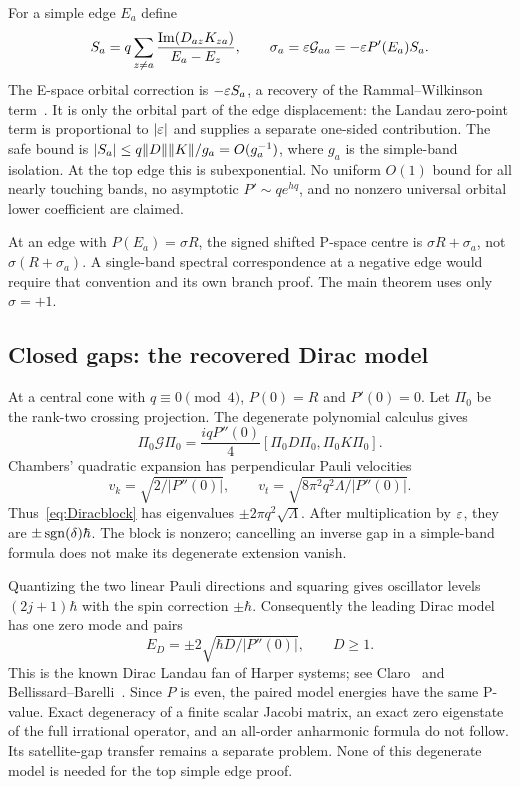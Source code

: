For a simple edge $E_a$ define
\[
 S_a=q\sum_{z\ne a}\frac{\operatorname{Im}(D_{az}K_{za})}{E_a-E_z},
 \qquad \sigma_a=\varepsilon\mathcal G_{aa}=-\varepsilon P'(E_a)S_a.
\]
The E-space orbital correction is $-\varepsilon S_a$, a recovery of the Rammal--Wilkinson term~\cite{RammalBellissard,Wilkinson1987,PST}. It is only the orbital part of the edge displacement: the Landau zero-point term is proportional to $|\varepsilon|$ and supplies a separate one-sided contribution. The safe bound is $|S_a|\le q\lVert D\rVert\lVert K\rVert/g_a=O(g_a^{-1})$, where $g_a$ is the simple-band isolation. At the top edge this is subexponential. No uniform $O(1)$ bound for all nearly touching bands, no asymptotic $P'\sim qe^{hq}$, and no nonzero universal orbital lower coefficient are claimed.

At an edge with $P(E_a)=\sigma R$, the signed shifted P-space centre is $\sigma R+\sigma_a$, not $\sigma(R+\sigma_a)$. A single-band spectral correspondence at a negative edge would require that convention and its own branch proof. The main theorem uses only $\sigma=+1$.

\subsection{Closed gaps: the recovered Dirac model}
At a central cone with $q\equiv0\pmod4$, $P(0)=R$ and $P'(0)=0$. Let $\Pi_0$ be the rank-two crossing projection. The degenerate polynomial calculus gives
\begin{equation}\label{eq:Diracblock}
 \Pi_0\mathcal G\Pi_0
   =\frac{iqP''(0)}4[\Pi_0D\Pi_0,\Pi_0K\Pi_0].
\end{equation}
Chambers' quadratic expansion has perpendicular Pauli velocities
\[
 v_k=\sqrt{2/|P''(0)|},\qquad
 v_t=\sqrt{8\pi^2q^2\Lambda/|P''(0)|}.
\]
Thus~\eqref{eq:Diracblock} has eigenvalues $\pm2\pi q^2\sqrt\Lambda$. After multiplication by $\varepsilon$, they are $\pm\operatorname{sgn}(\delta)\hbar$. The block is nonzero; cancelling an inverse gap in a simple-band formula does not make its degenerate extension vanish.

Quantizing the two linear Pauli directions and squaring gives oscillator levels $(2j+1)\hbar$ with the spin correction $\pm\hbar$. Consequently the leading Dirac model has one zero mode and pairs
\[
 E_D=\pm2\sqrt{\hbar D/|P''(0)|},\qquad D\ge1.
\]
This is the known Dirac Landau fan of Harper systems; see Claro~\cite[(4)--(6)]{Claro} and Bellissard--Barelli~\cite[Section~1.3]{BellissardBarelli}. Since $P$ is even, the paired model energies have the same P-value. Exact degeneracy of a finite scalar Jacobi matrix, an exact zero eigenstate of the full irrational operator, and an all-order anharmonic formula do not follow. Its satellite-gap transfer remains a separate problem. None of this degenerate model is needed for the top simple edge proof.

\label{end:remainder}
